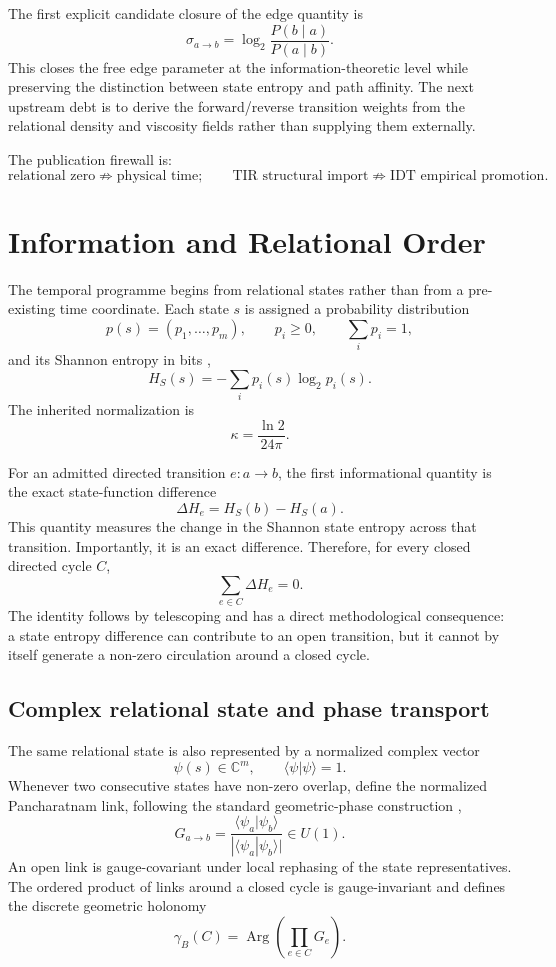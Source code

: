 The first explicit candidate closure of the edge quantity is
\[
\sigma_{a\to b}=\log_2\frac{P(b\mid a)}{P(a\mid b)}.
\]
This closes the free edge parameter at the information-theoretic level while preserving the distinction between state entropy and path affinity. The next upstream debt is to derive the forward/reverse transition weights from the relational density and viscosity fields rather than supplying them externally.

The publication firewall is:
\[
\boxed{
\text{relational zero}
\not\Rightarrow
\text{physical time};
\qquad
\text{TIR structural import}
\not\Rightarrow
\text{IDT empirical promotion}.
}
\]


\chapter{Information and Relational Order}

The temporal programme begins from relational states rather than from a pre-existing time coordinate. Each state $s$ is assigned a probability distribution
\[
p(s)=(p_1,\ldots,p_m),
\qquad
p_i\geq0,
\qquad
\sum_i p_i=1,
\]
and its Shannon entropy in bits \cite{Shannon1948},
\[
\boxed{
H_S(s)=-\sum_i p_i(s)\log_2p_i(s).
}
\]
The inherited normalization is
\[
\kappa=\frac{\ln2}{24\pi}.
\]

For an admitted directed transition $e:a\to b$, the first informational quantity is the exact state-function difference
\[
\Delta H_e=H_S(b)-H_S(a).
\]
This quantity measures the change in the Shannon state entropy across that transition. Importantly, it is an exact difference. Therefore, for every closed directed cycle $C$,
\[
\boxed{
\sum_{e\in C}\Delta H_e=0.
}
\]
The identity follows by telescoping and has a direct methodological consequence: a state entropy difference can contribute to an open transition, but it cannot by itself generate a non-zero circulation around a closed cycle.

\section{Complex relational state and phase transport}

The same relational state is also represented by a normalized complex vector
\[
\psi(s)\in\mathbb C^m,
\qquad
\langle\psi|\psi\rangle=1.
\]
Whenever two consecutive states have non-zero overlap, define the normalized Pancharatnam link, following the standard geometric-phase construction \cite{Pancharatnam1956,Berry1984},
\[
G_{a\to b}
=
\frac{\langle\psi_a|\psi_b\rangle}
{|\langle\psi_a|\psi_b\rangle|}
\in U(1).
\]
An open link is gauge-covariant under local rephasing of the state representatives. The ordered product of links around a closed cycle is gauge-invariant and defines the discrete geometric holonomy
\[
\gamma_B(C)
=
\operatorname{Arg}\!\left(\prod_{e\in C}G_e\right).
\]

